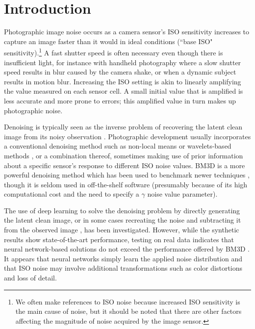 \chapter{Introduction}

Photographic image noise occurs as a camera sensor's ISO sensitivity increases to capture an image faster than it would in ideal conditions (``base ISO" sensitivity).\footnote{We often make references to ISO noise because increased ISO sensitivity is the main cause of noise, but it should be noted that there are other factors affecting the magnitude of noise acquired by the image sensor.} A fast shutter speed is often necessary even though there is insufficient light, for instance with handheld photography where a slow shutter speed results in blur caused by the camera shake, or when a dynamic subject results in motion blur. Increasing the ISO setting is akin to linearly amplifying the value measured on each sensor cell. A small initial value that is amplified is less accurate and more prone to errors; this amplified value in turn makes up photographic noise. 

Denoising is typically seen as the inverse problem of recovering the latent clean image from its noisy observation \cite{rednet}. 
Photographic development usually incorporates a conventional denoising method such as non-local means \cite{nlm} or wavelets-based methods \cite{wavelets-denoising}, or a combination thereof, sometimes making use of prior information about a specific sensor's response to different ISO noise values. \cite{darktable-denoising}
\ac{BM3D} is a more powerful denoising method which has been used to benchmark newer techniques \cite{all-bm3d-benchmarks}, though it is seldom used in off-the-shelf software (presumably because of its high computational cost and the need to specify a $\gamma$ noise value parameter). 

The use of deep learning to solve the denoising problem by directly generating the latent clean image, or in some cases recreating the noise and subtracting it from the observed image \cite{dncnn}, has been investigated. However, while the synthetic results show state-of-the-art performance, testing on real data indicates that neural network-based solutions do not exceed the performance offered by \ac{BM3D} \cite{darmstadt}. It appears that neural networks simply learn the applied noise distribution and that ISO noise may involve additional transformations such as color distortions and loss of detail.


